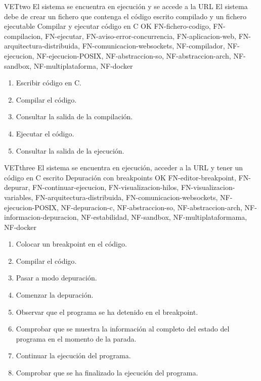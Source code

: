     \begin{testCase}{VET}{two}
        {El sistema se encuentra en ejecución y se accede a la URL}
        {El sistema debe de crear un fichero que contenga el código escrito compilado y un fichero ejecutable}
        {Compilar y ejecutar código en C}
        {OK}
        {FN-fichero-codigo, FN-compilacion, FN-ejecutar, FN-aviso-error-concurrencia, FN-aplicacion-web, FN-arquitectura-distribuida, FN-comunicacion-websockets, NF-compilador, NF-ejecucion, NF-ejecucion-POSIX, NF-abstraccion-so, NF-abstraccion-arch, NF-sandbox, NF-multiplataforma, NF-docker}
        \begin{enumerate}
            \item Escribir código en C.
            \item Compilar el código.
            \item Consultar la salida de la compilación.
            \item Ejecutar el código.
            \item Consultar la salida de la ejecución.
        \end{enumerate}
    \end{testCase}

    \begin{testCase}{VET}{three}
        {El sistema se encuentra en ejecución, acceder a la URL y tener un código en C escrito}
        {\NA}
        {Depuración con breakpoints}
        {OK}
        {FN-editor-breakpoint, FN-depurar, FN-continuar-ejecucion, FN-visualizacion-hilos, FN-visualizacion-variables, FN-arquitectura-distribuida, FN-comunicacion-websockets, NF-ejecucion-POSIX, NF-depuracion-c, NF-abstraccion-so, NF-abstraccion-arch, NF-informacion-depuracion, NF-estabilidad, NF-sandbox, NF-multiplataformama, NF-docker}
        \begin{enumerate}
            \item Colocar un breakpoint en el código.
            \item Compilar el código.
            \item Pasar a modo depuración.
            \item Comenzar la depuración.
            \item Observar que el programa se ha detenido en el breakpoint.
            \item Comprobar que se muestra la información al completo del estado del programa en el momento de la parada.
            \item Continuar la ejecución del programa.
            \item Comprobar que se ha finalizado la ejecución del programa.
        \end{enumerate}
    \end{testCase}

